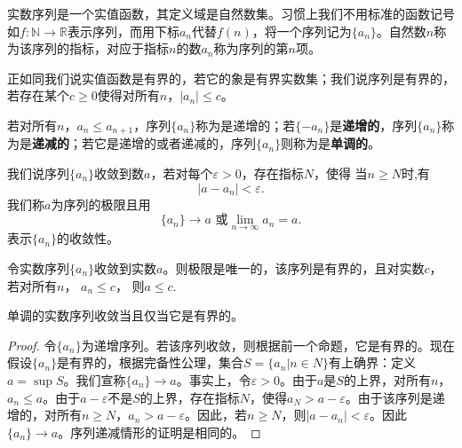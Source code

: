 \documentclass[lang=cn,newtx,10pt,scheme=chinese]{../Template/elegantbook}
\begin{document}
\begin{definition}\label{definition:实数序列/实数列}
  实数序列是一个实值函数，其定义域是自然数集。习惯上我们不用标准的函数记号如\(f:\mathbb{N}\to\mathbb{R}\)表示序列，而用下标\(a_n\)代替\(f(n)\)，将一个序列记为\(\{a_n\}\)。自然数\(n\)称为该序列的指标，对应于指标\(n\)的数\(a_n\)称为序列的第\(n\)项。
  
  正如同我们说实值函数是有界的，若它的象是有界实数集；我们说序列是有界的，若存在某个\(c\geqslant0\)使得对所有\(n\)，\(\vert a_n\vert\leqslant c\)。
  
  若对所有\(n\)，\(a_n\leqslant a_{n + 1}\)，序列\(\{a_n\}\)称为是递增的；若\(\{-a_n\}\)是\textbf{递增的}，序列\(\{a_n\}\)称为是\textbf{递减的}；若它是递增的或者递减的，序列\(\{a_n\}\)则称为是\textbf{单调的}。
\end{definition}

\begin{definition}
  我们说序列\(\{a_n\}\)收敛到数\(a\)，若对每个\(\varepsilon>0\)，存在指标\(N\)，使得
当\(n\geqslant N\)时,有\[\vert a - a_n\vert<\varepsilon.\]
我们称\(a\)为序列的极限且用
\[\{a_n\}\to a\text{ 或}\lim_{n\to\infty}a_n = a.\]
表示\(\{a_n\}\)的收敛性。
\end{definition}

\begin{proposition}[收敛的实数列的性质]\label{proposition:收敛的实数列的性质}
  令实数序列\(\{a_n\}\)收敛到实数\(a\)。则极限是唯一的，该序列是有界的，且对实数\(c\)，
若对所有\(n\)， \(a_n\leqslant c\)， 则\(a\leqslant c\).
\end{proposition}

\begin{theorem}[实数序列的单调收敛准则]\label{theorem:实数序列的单调收敛准则}
单调的实数序列收敛当且仅当它是有界的。
\end{theorem}
\begin{proof}
  令\(\{a_n\}\)为递增序列。若该序列收敛，则根据前一个命题，它是有界的。现在假设\(\{a_n\}\)是有界的，根据完备性公理，集合\(S = \{a_n|n\in N\}\)有上确界：定义\(a = \sup S\)。我们宣称\(\{a_n\}\to a\)。事实上，令\(\varepsilon>0\)。由于\(a\)是\(S\)的上界，对所有\(n\)，\(a_n\leqslant a\)。由于\(a - \varepsilon\)不是\(S\)的上界，存在指标\(N\)，使得\(a_N>a - \varepsilon\)。由于该序列是递增的，对所有\(n\geqslant N\)，\(a_n>a - \varepsilon\)。因此，若\(n\geqslant N\)，则\(\vert a - a_n\vert<\varepsilon\)。因此\(\{a_n\}\to a\)。序列递减情形的证明是相同的。

\end{proof}
\end{document}
